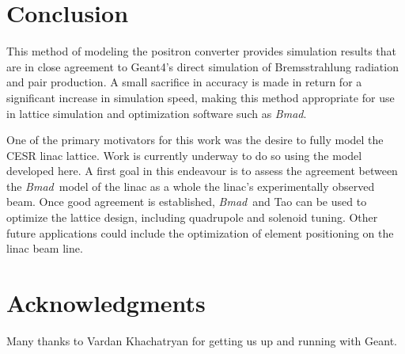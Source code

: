 \documentclass[letter,
               biblatex,     %
               keeplastbox,   %
               ]{jacow}
\newcommand{\bmad}{\textit{Bmad}}
\begin{document}
\section{Conclusion}

This method of modeling the positron converter provides simulation results that are in close agreement to Geant4's direct simulation of Bremsstrahlung radiation and pair production.
A small sacrifice in accuracy is made in return for a significant increase in simulation speed, making this method appropriate for use in lattice simulation and optimization software such as \bmad.

One of the primary motivators for this work was the desire to fully model the CESR linac lattice.
Work is currently underway to do so using the model developed here.
A first goal in this endeavour is to assess the agreement between the \bmad\,  model of the linac as a whole the linac's experimentally observed beam.
Once good agreement is established, \bmad \, and Tao can be used to optimize the lattice design, including quadrupole and solenoid tuning.
Other future applications could include the optimization of element positioning on the linac beam line.



\section{Acknowledgments}

Many thanks to Vardan Khachatryan for getting us up and running with Geant.


\printbibliography

\clearpage
\end{document}

